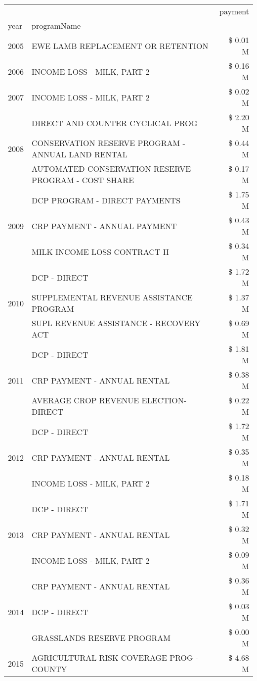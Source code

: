 \begin{tabular}{llr}
\toprule
 &  & payment \\
year & programName &  \\
\midrule
2005 & EWE LAMB REPLACEMENT OR RETENTION & \$ 0.01 M \\
\cline{1-3}
2006 & INCOME LOSS - MILK, PART 2 & \$ 0.16 M \\
\cline{1-3}
2007 & INCOME LOSS - MILK, PART 2 & \$ 0.02 M \\
\cline{1-3}
\multirow[t]{3}{*}{2008} & DIRECT AND COUNTER CYCLICAL PROG & \$ 2.20 M \\
 & CONSERVATION RESERVE PROGRAM - ANNUAL LAND RENTAL & \$ 0.44 M \\
 & AUTOMATED CONSERVATION RESERVE PROGRAM - COST SHARE & \$ 0.17 M \\
\cline{1-3}
\multirow[t]{3}{*}{2009} & DCP PROGRAM - DIRECT PAYMENTS & \$ 1.75 M \\
 & CRP PAYMENT - ANNUAL PAYMENT & \$ 0.43 M \\
 & MILK INCOME LOSS CONTRACT II & \$ 0.34 M \\
\cline{1-3}
\multirow[t]{3}{*}{2010} & DCP - DIRECT & \$ 1.72 M \\
 & SUPPLEMENTAL REVENUE ASSISTANCE PROGRAM & \$ 1.37 M \\
 & SUPL REVENUE ASSISTANCE - RECOVERY ACT & \$ 0.69 M \\
\cline{1-3}
\multirow[t]{3}{*}{2011} & DCP - DIRECT & \$ 1.81 M \\
 & CRP PAYMENT - ANNUAL RENTAL & \$ 0.38 M \\
 & AVERAGE CROP REVENUE ELECTION-DIRECT & \$ 0.22 M \\
\cline{1-3}
\multirow[t]{3}{*}{2012} & DCP - DIRECT & \$ 1.72 M \\
 & CRP PAYMENT - ANNUAL RENTAL & \$ 0.35 M \\
 & INCOME LOSS - MILK, PART 2 & \$ 0.18 M \\
\cline{1-3}
\multirow[t]{3}{*}{2013} & DCP - DIRECT & \$ 1.71 M \\
 & CRP PAYMENT - ANNUAL RENTAL & \$ 0.32 M \\
 & INCOME LOSS - MILK, PART 2 & \$ 0.09 M \\
\cline{1-3}
\multirow[t]{3}{*}{2014} & CRP PAYMENT - ANNUAL RENTAL & \$ 0.36 M \\
 & DCP - DIRECT & \$ 0.03 M \\
 & GRASSLANDS RESERVE PROGRAM & \$ 0.00 M \\
\cline{1-3}
\multirow[t]{3}{*}{2015} & AGRICULTURAL RISK COVERAGE PROG - COUNTY & \$ 4.68 M \\

\end{tabular}
